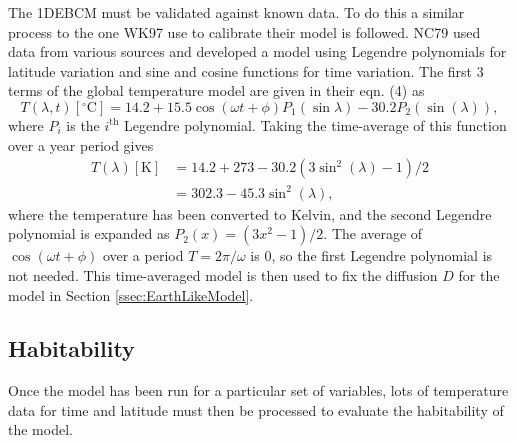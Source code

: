 \documentclass[12pt, onecolumn]{revtex4-2}    %
\newcommand{\degrees}{\ensuremath{^{\circ}}}
\begin{document}
The 1DEBCM must be validated against known data.
To do this a similar process to the one WK97 use to calibrate their model is followed.
NC79 used data from various sources and developed a model using Legendre polynomials for latitude variation and sine and cosine functions for time variation.
The first 3 terms of the global temperature model are given in their eqn. (4) as
\begin{equation}
  T(\lambda, t)[\degrees\text{C}] = 14.2 + 15.5 \cos(\omega t + \phi) P_1(\sin\lambda) - 30.2 P_2(\sin(\lambda)),
  \label{eq:NC_timedep}
\end{equation}
where $P_i$ is the $i^\text{th}$ Legendre polynomial.
Taking the time-average of this function over a year period gives
\begin{equation}
  \begin{split}
    T(\lambda)[\text{K}] & = 14.2 + 273 - 30.2 (3 \sin^2(\lambda) - 1) / 2 \\
                         & = 302.3 - 45.3\sin^2(\lambda),
  \end{split}
  \label{eq:NC_timeavg}
\end{equation}
where the temperature has been converted to Kelvin, and the second Legendre polynomial is expanded as $P_2(x) =(3x^2-1) / 2$.
The average of $\cos(\omega t + \phi)$ over a period $T = 2\pi / \omega$ is $0$, so the first Legendre polynomial is not needed.
This time-averaged model is then used to fix the diffusion $D$ for the model in Section \ref{ssec:EarthLikeModel}.



\subsection{Habitability} \label{ssec:Habitability_intro}
Once the model has been run for a particular set of variables, lots of temperature data for time and latitude must then be processed to evaluate the habitability of the model.
\end{document}
